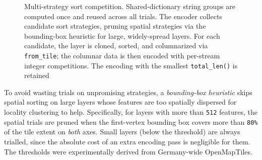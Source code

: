 \begin{figure}[htbp]
    \caption{Multi-strategy sort competition.
        Shared-dictionary string groups are computed once and reused across all trials.
        The encoder collects candidate sort strategies, pruning spatial strategies via the bounding-box heuristic for large, widely-spread layers.
        For each candidate, the layer is cloned, sorted, and columnarized via \texttt{from\_tile}; the columnar data is then encoded with per-stream integer competitions.
        The encoding with the smallest \texttt{total\_len()} is retained}
    \label{fig:sort_competition}
\end{figure}

To avoid wasting trials on unpromising strategies, a \emph{bounding-box heuristic} skips spatial sorting on large layers whose features are too spatially dispersed for locality clustering to help.
Specifically, for layers with more than \texttt{512} features, the spatial trials are pruned when the first-vertex bounding box covers more than \texttt{80\%} of the tile extent on \emph{both} axes.
Small layers (below the threshold) are always trialled, since the absolute cost of an extra encoding pass is negligible for them.
The thresholds were experimentally derived from Germany-wide OpenMapTiles.

